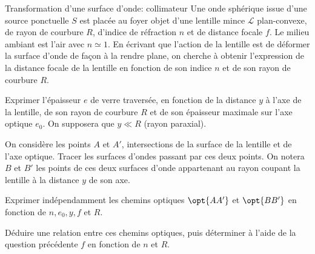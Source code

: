 \begin{exo}[PC]{Transformation d'une surface d'onde: collimateur}
Une onde sphérique issue d'une source ponctuelle $S$ est placée au foyer objet d'une lentille mince $\mathcal{L}$ plan-convexe, de rayon de courbure $R$, d'indice de réfraction $n$ et de distance focale $f$. Le milieu ambiant est l'air avec $n\simeq 1$. En écrivant que l'action de la lentille est de déformer la surface d'onde de façon à la rendre plane, on cherche à obtenir l'expression de la distance focale de la lentille en fonction de son indice $n$ et de son rayon de courbure $R$.
\begin{quest}
\item Exprimer l'épaisseur $e$ de verre traversée, en fonction de la distance $y$ à l'axe de la lentille, de son rayon de courbure $R$ et de son épaisseur maximale sur l'axe optique $e_0$. On supposera que $y\ll R$ (rayon paraxial).
\item On considère les points $A$ et $A'$, intersections de la surface de la lentille et de l'axe optique. Tracer les surfaces d'ondes passant par ces deux points. On notera $B$ et $B'$ les points de ces deux surfaces d'onde appartenant au rayon coupant la lentille à la distance $y$ de son axe.
\sol{

}
\item Exprimer indépendamment les chemins optiques $\opt{AA'}$ et $\opt{BB'}$ en fonction de $n,e_0,y,f$ et $R$.
\item Déduire une relation entre ces chemins optiques, puis déterminer à l'aide de la question précédente $f$ en fonction de $n$ et $R$.
\end{quest}
\end{exo}

